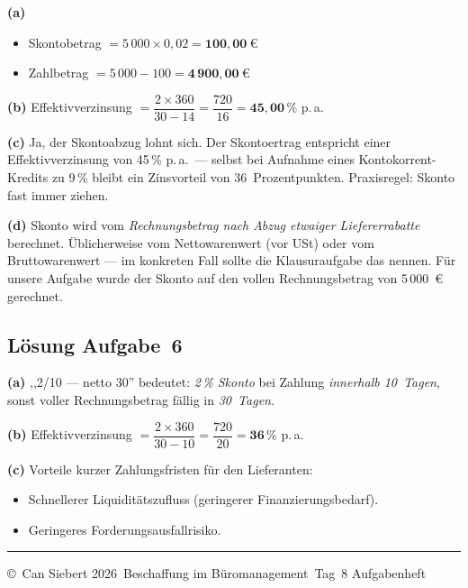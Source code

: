 \documentclass[11pt, a4paper]{article}
\begin{document}
\begin{loesung}
\textbf{(a)}
\begin{itemize}[itemsep=0pt]
  \item Skontobetrag $= 5\,000 \times 0{,}02 = \mathbf{100{,}00~€}$
  \item Zahlbetrag $= 5\,000 - 100 = \mathbf{4\,900{,}00~€}$
\end{itemize}

\textbf{(b)} Effektivverzinsung $= \dfrac{2 \times 360}{30 - 14} = \dfrac{720}{16} = \mathbf{45{,}00\,\%}$ p.\,a.

\textbf{(c)} Ja, der Skontoabzug lohnt sich. Der Skontoertrag entspricht einer
Effektivverzinsung von 45\,\% p.\,a.\ --- selbst bei Aufnahme eines Kontokorrent-Kredits
zu 9\,\% bleibt ein Zinsvorteil von 36~Prozentpunkten. Praxisregel: Skonto fast immer
ziehen.

\textbf{(d)} Skonto wird vom \emph{Rechnungsbetrag nach Abzug etwaiger Liefererrabatte}
berechnet. Üblicherweise vom Nettowarenwert (vor USt) oder vom Bruttowarenwert ---
im konkreten Fall sollte die Klausuraufgabe das nennen. Für unsere Aufgabe wurde der
Skonto auf den vollen Rechnungsbetrag von 5\,000~€ gerechnet.
\end{loesung}

\subsection*{Lösung Aufgabe~6}

\begin{loesung}
\textbf{(a)} ,,2/10 --- netto 30'' bedeutet: \emph{2\,\% Skonto} bei Zahlung
\emph{innerhalb 10~Tagen}, sonst voller Rechnungsbetrag fällig in \emph{30~Tagen}.

\textbf{(b)} Effektivverzinsung $= \dfrac{2 \times 360}{30 - 10} = \dfrac{720}{20} = \mathbf{36\,\%}$ p.\,a.

\textbf{(c)} Vorteile kurzer Zahlungsfristen für den Lieferanten:
\begin{itemize}[itemsep=0pt]
  \item Schnellerer Liquiditätszufluss (geringerer Finanzierungsbedarf).
  \item Geringeres Forderungsausfallrisiko.
\end{itemize}
\end{loesung}

\vfill
\hrule
\vspace{0.5em}
\noindent\small\color{bfwInkSoft}\copyright\ Can Siebert\,\textperiodcentered\,2026\,\textperiodcentered{} Beschaffung im Büromanagement\,\textperiodcentered{} Tag~8 Aufgabenheft
\end{document}
